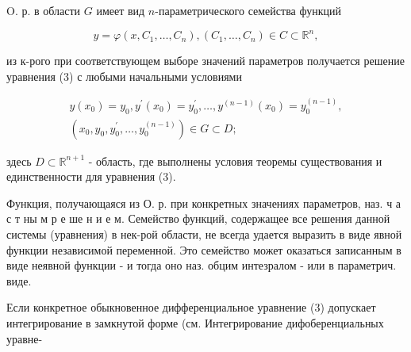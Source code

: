 \documentclass[10pt]{article}
\begin{document}
O. р. в области $G$ имеет вид $n$-параметрического семейства функций



\[

y=\varphi\left(x, C_{1}, \ldots, C_{n}\right),\left(C_{1}, \ldots, C_{n}\right) \in C \subset \mathbb{R}^{n},

\]



из к-рого при соответствующем выборе значений параметров получается решение уравнения (3) с любыми начальными условиями



\[

\begin{gathered}

y\left(x_{0}\right)=y_{0}, y^{\prime}\left(x_{0}\right)=y_{0}^{\prime}, \ldots, y^{(n-1)}\left(x_{0}\right)=y_{0}^{(n-1)}, \\

\left(x_{0}, y_{0}, y_{0}^{\prime}, \ldots, y_{0}^{(n-1)}\right) \in G \subset D ;

\end{gathered}

\]



здесь $D \subset \mathbb{R}^{n+1}$ - область, где выполнены условия теоремы существования и единственности для уравнения (3).



Функция, получающаяся из О. р. при конкретных значениях параметров, наз. ч а с т ны м р е ше н и е м. Семейство функций, содержащее все решения данной системы (уравнения) в нек-рой области, не всегда удается выразить в виде явной функции независимой переменной. Это семейство может оказаться записанным в виде неявной функции - и тогда оно наз. обцим интезралом - или в параметрич. виде.



Если конкретное обыкновенное дифференциальное уравнение (3) допускает интегрирование в замкнутой форме (см. Интегрирование дифоберенциальных уравне-
\end{document}
